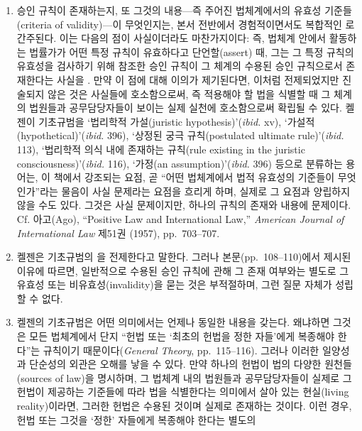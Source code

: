 {\begin{enumerate}
\def\labelenumi{\arabic{enumi}.}
\item
  승인 규칙이 존재하는지, 또 그것의 내용---즉 주어진 법체계에서의 유효성
  기준들(criteria of validity)---이 무엇인지는, 본서 전반에서
  경험적이면서도 복합적인 로 간주된다.
  이는 다음의 점이 사실이더라도 마찬가지이다: 즉, 법체계 안에서 활동하는
  법률가가 어떤 특정 규칙이 유효하다고 단언할(assert) 때, 그는 그 특정
  규칙의 유효성을 검사하기 위해 참조한 승인 규칙이 그 체계의 수용된 승인
  규칙으로서 존재한다는 사실을  . 만약 이 점에 대해 이의가 제기된다면, 이처럼
  전제되었지만 진술되지 않은 것은 사실들에 호소함으로써, 즉 적용해야 할
  법을 식별할 때 그 체계의 법원들과 공무담당자들이 보이는 실제 실천에
  호소함으로써 확립될 수 있다. 켈젠이 기초규범을 ‘법리학적 가설(juristic
  hypothesis)’(\emph{ibid.} xv), ‘가설적(hypothetical)’(\emph{ibid.}
  396), ‘상정된 궁극 규칙(postulated ultimate rule)’(\emph{ibid.} 113),
  ‘법리학적 의식 내에 존재하는 규칙(rule existing in the juristic
  consciousness)’(\emph{ibid.} 116), ‘가정(an assumption)’(\emph{ibid.}
  396) 등으로 분류하는 용어는, 이 책에서 강조되는 요점, 곧 “어떤
  법체계에서 법적 유효성의 기준들이 무엇인가”라는 물음이 사실 문제라는
  요점을 흐리게 하며, 실제로 그 요점과 양립하지 않을 수도 있다. 그것은
  사실 문제이지만, 하나의 규칙의 존재와 내용에 
  문제이다. Cf. 아고(Ago), “Positive Law and International Law,”
  \emph{American Journal of International Law} 제51권 (1957),
  pp.~703--707.
\item
  켈젠은 기초규범의 을 전제한다고 말한다. 그러나
  본문(pp.~108--110)에서 제시된 이유에 따르면, 일반적으로 수용된 승인
  규칙에 관해 그 존재 여부와는 별도로 그 유효성 또는
  비유효성(invalidity)을 묻는 것은 부적절하며, 그런 질문 자체가 성립할
  수 없다.
\item
  켈젠의 기초규범은 어떤 의미에서는 언제나 동일한 내용을 갖는다.
  왜냐하면 그것은 모든 법체계에서 단지 “헌법 또는 ‘최초의 헌법을 정한
  자들’에게 복종해야 한다”는 규칙이기 때문이다(\emph{General Theory},
  pp.~115--116). 그러나 이러한 일양성과 단순성의 외관은 오해를 낳을 수
  있다. 만약 하나의 헌법이 법의 다양한 원천들(sources of law)을
  명시하며, 그 법체계 내의 법원들과 공무담당자들이 실제로 그 헌법이
  제공하는 기준들에 따라 법을 식별한다는 의미에서 살아 있는 현실(living
  reality)이라면, 그러한 헌법은 수용된 것이며 실제로 존재하는 것이다.
  이런 경우, 헌법 또는 그것을 ‘정한’ 자들에게 복종해야 한다는 별도의

\end{enumerate}}

